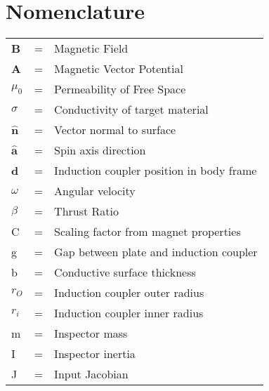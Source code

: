 \section*{Nomenclature}
\noindent\begin{tabular}{@{}lcl@{}}
\textbf{B}  &=& Magnetic Field \\
\textbf{A}&=&    Magnetic Vector Potential \\
$\mu_0$&=& Permeability of Free Space \\
$\sigma$ &=& Conductivity of target material \\
$\hat{\textbf{n}}$ &=& Vector normal to surface \\
$\hat{\textbf{a}}$   &=& Spin axis direction\\
\textbf{d} &=& Induction coupler position in body frame \\
$\omega$ &=& Angular velocity \\
$\beta$ &=& Thrust Ratio \\
C &=& Scaling factor from magnet properties \\
g   &=& Gap between plate and induction coupler \\
b  &=& Conductive surface thickness \\
$r_O$  &=& Induction coupler outer radius \\
$r_i$  &=& Induction coupler inner radius \\
m  &=& Inspector mass \\
I &=& Inspector inertia \\
J &=& Input Jacobian \\
\end{tabular} \\

